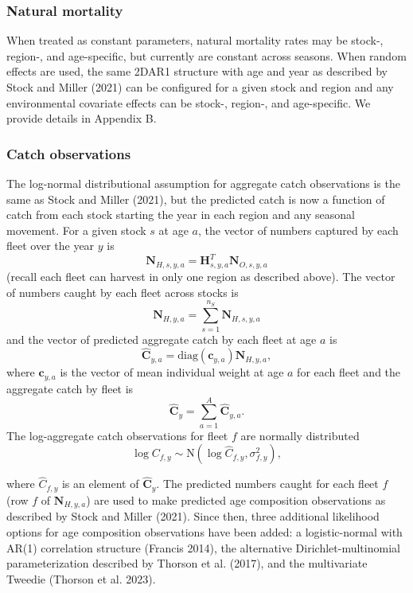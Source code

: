 \documentclass[
]{article}
\begin{document}
\hypertarget{natural-mortality}{%
\subsubsection*{Natural mortality}\label{natural-mortality}}

When treated as constant parameters, natural mortality rates may be stock-, region-, and age-specific, but currently are constant across seasons. When random effects are used, the same 2DAR1 structure with age and year as described by Stock and Miller (2021) can be configured for a given stock and region and any environmental covariate effects can be stock-, region-, and age-specific. We provide details in Appendix B.

\hypertarget{catch-observations}{%
\subsubsection*{Catch observations}\label{catch-observations}}

The log-normal distributional assumption for aggregate catch observations is the same as Stock and Miller (2021), but the predicted catch is now a function of catch from each stock starting the year in each region and any seasonal movement. For a given stock \(s\) at age \(a\), the vector of numbers captured by each fleet over the year \(y\) is
\[\mathbf{N}_{H,s,y,a} = \mathbf{H}_{s,y,a}^T \mathbf{N}_{O,s,y,a}\]
(recall each fleet can harvest in only one region as described above). The vector of numbers caught by each fleet across stocks is
\[\mathbf{N}_{H,y,a} = \sum^{n_S}_{s=1} \mathbf{N}_{H,s,y,a}\]
and the vector of predicted aggregate catch by each fleet at age \(a\) is
\[\widehat{\mathbf{C}}_{y,a} = \text{diag}\left(\mathbf{c}_{y,a}\right) \mathbf{N}_{H,y,a},\]
where \(\mathbf{c}_{y,a}\) is the vector of mean individual weight at age \(a\) for each fleet and the aggregate catch by fleet is
\[\widehat{\mathbf{C}}_y = \sum^{A}_{a=1} \widehat{\mathbf{C}}_{y,a}.\]
The log-aggregate catch observations for fleet \(f\) are normally distributed
\[ \log C_{f,y} \sim \text{N}\left(\log \widehat {C}_{f,y}, \sigma^2_{f,y}\right),\]

where \(\widehat C_{f,y}\) is an element of \(\widehat{\mathbf{C}}_y\). The predicted numbers caught for each fleet \(f\) (row \(f\) of \(\mathbf{N}_{H,y,a}\)) are used to make predicted age composition observations as described by Stock and Miller (2021). Since then, three additional likelihood options for age composition observations have been added: a logistic-normal with AR(1) correlation structure (Francis 2014), the alternative Dirichlet-multinomial parameterization described by Thorson et al. (2017), and the multivariate Tweedie (Thorson et al. 2023).
\end{document}
